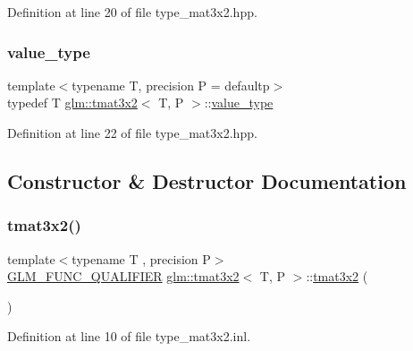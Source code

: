 Definition at line 20 of file type\+\_\+mat3x2.\+hpp.

\mbox{\label{structglm_1_1tmat3x2_a68ba5fe1734aa7ee61cc637b5de9f696}} 
\subsubsection{\texorpdfstring{value\_type}{value\_type}}
{\footnotesize\ttfamily template$<$typename T, precision P = defaultp$>$ \\
typedef T \mbox{\hyperlink{structglm_1_1tmat3x2}{glm\+::tmat3x2}}$<$ T, P $>$\+::\mbox{\hyperlink{structglm_1_1tmat3x2_a68ba5fe1734aa7ee61cc637b5de9f696}{value\+\_\+type}}}



Definition at line 22 of file type\+\_\+mat3x2.\+hpp.



\subsection{Constructor \& Destructor Documentation}
\mbox{\label{structglm_1_1tmat3x2_af6769c468c605112c3bf8db506d3fa73}} 
\subsubsection{\texorpdfstring{tmat3x2()}{tmat3x2()}\hspace{0.1cm}{\footnotesize\ttfamily [1/22]}}
{\footnotesize\ttfamily template$<$typename T , precision P$>$ \\
\mbox{\hyperlink{setup_8hpp_a33fdea6f91c5f834105f7415e2a64407}{G\+L\+M\+\_\+\+F\+U\+N\+C\+\_\+\+Q\+U\+A\+L\+I\+F\+I\+ER}} \mbox{\hyperlink{structglm_1_1tmat3x2}{glm\+::tmat3x2}}$<$ T, P $>$\+::\mbox{\hyperlink{structglm_1_1tmat3x2}{tmat3x2}} (\begin{DoxyParamCaption}{ }\end{DoxyParamCaption})}



Definition at line 10 of file type\+\_\+mat3x2.\+inl.

\mbox{\label{structglm_1_1tmat3x2_a654f76d38f00d3c005a9bddb23200c2e}} 
